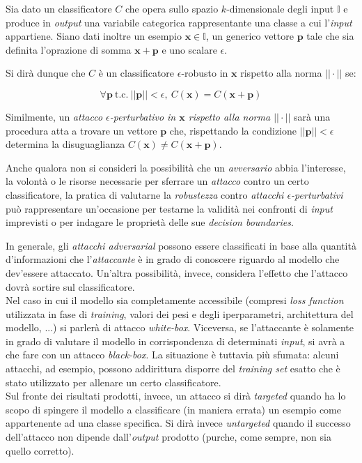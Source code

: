 \documentclass[a4paper, twoside]{article}
\begin{document}
Sia dato un classificatore $C$ che opera sullo spazio $k$-dimensionale degli input  $\mathbb{I}$ e produce in \textit{output} una variabile categorica rappresentante una classe a cui l'\textit{input} appartiene. Siano dati inoltre un esempio $\boldsymbol{x} \in \mathbb{I}$, un generico vettore $\boldsymbol{p}$ tale che sia definita l'oprazione di somma $\boldsymbol{x} + \boldsymbol{p}$ e uno scalare $\epsilon$.

Si dirà dunque che $C$ è un classificatore $\epsilon$-robusto in $\boldsymbol{x}$ rispetto alla norma $|| \cdot ||$ se:

$$
\forall \boldsymbol{p} \ \text{t.c.} \ ||\boldsymbol{p}|| < \epsilon, \ C(\boldsymbol{x}) = C(\boldsymbol{x} +\boldsymbol{p} )
$$

Similmente, un \textit{attacco $\epsilon$-perturbativo in $\boldsymbol{x}$ rispetto alla norma $|| \cdot ||$} sarà una procedura atta a trovare un vettore $\boldsymbol{p}$ che, rispettando la condizione $||\boldsymbol{p}|| < \epsilon$ determina la disuguaglianza $C(\boldsymbol{x}) \neq C(\boldsymbol{x} +\boldsymbol{p} )$.

Anche qualora non si consideri la possibilità che un \textit{avversario} abbia l'interesse, la volontà o le risorse necessarie per sferrare un \textit{attacco} contro un certo classificatore, la pratica di valutarne la \textit{robustezza} contro \textit{attacchi $\epsilon$-perturbativi} può rappresentare un'occasione per testarne la validità nei confronti di \textit{input} imprevisti o per indagare le proprietà delle sue \textit{decision boundaries}.

In generale, gli \textit{attacchi \textit{adversarial}} possono essere classificati in base alla quantità d'informazioni che l'\textit{attaccante} è in grado di conoscere riguardo al modello che dev'essere attaccato. Un'altra possibilità, invece, considera l'effetto che l'attacco dovrà sortire sul classificatore.\\
Nel caso in cui il modello sia completamente accessibile (compresi \textit{loss function} utilizzata in fase di \textit{training}, valori dei pesi e degli iperparametri, architettura del modello, ...) si parlerà di attacco \textit{white-box}. Viceversa, se l'attaccante è solamente in grado di valutare il modello in corrispondenza di determinati \textit{input}, si avrà a che fare con un attacco \textit{black-box}. La situazione è tuttavia più sfumata: alcuni attacchi, ad esempio, possono addirittura disporre del \textit{training set} esatto che è stato utilizzato per allenare un certo classificatore.\\
Sul fronte dei risultati prodotti, invece, un attacco si dirà \textit{targeted} quando ha lo scopo di spingere il modello a classificare (in maniera errata) un esempio come appartenente ad una classe specifica. Si dirà invece \textit{untargeted} quando il successo dell'attacco non dipende dall'\textit{output} prodotto (purche, come sempre, non sia quello corretto).
\end{document}
